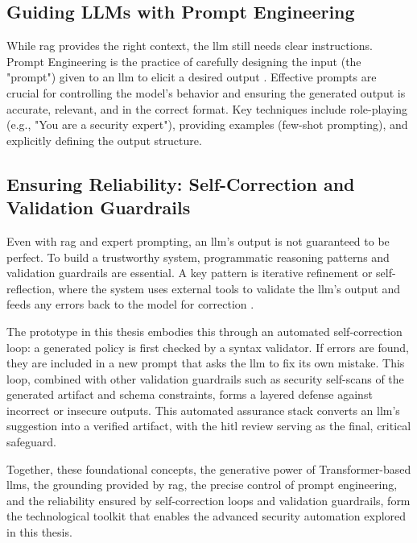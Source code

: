 \subsection{Guiding LLMs with Prompt Engineering}
While \gls{rag} provides the right context, the \gls{llm} still needs clear instructions. Prompt Engineering is the practice of carefully designing the input (the "prompt") given to an \gls{llm} to elicit a desired output \cite{sahoo_systematic_2024}. Effective prompts are crucial for controlling the model's behavior and ensuring the generated output is accurate, relevant, and in the correct format. Key techniques include role-playing (e.g., "You are a security expert"), providing examples (few-shot prompting), and explicitly defining the output structure.

\subsection{Ensuring Reliability: Self-Correction and Validation Guardrails}
Even with \gls{rag} and expert prompting, an \gls{llm}'s output is not guaranteed to be perfect. To build a trustworthy system, programmatic reasoning patterns and validation guardrails are essential. A key pattern is iterative refinement or self-reflection, where the system uses external tools to validate the \gls{llm}'s output and feeds any errors back to the model for correction \cite{vaswani_attention_2023}.

The prototype in this thesis embodies this through an automated self-correction loop: a generated policy is first checked by a syntax validator. If errors are found, they are included in a new prompt that asks the \gls{llm} to fix its own mistake. This loop, combined with other validation guardrails such as security self-scans of the generated artifact and schema constraints, forms a layered defense against incorrect or insecure outputs. This automated assurance stack converts an \gls{llm}'s suggestion into a verified artifact, with the \gls{hitl} review serving as the final, critical safeguard.

Together, these foundational concepts, the generative power of Transformer-based \glspl{llm}, the grounding provided by \gls{rag}, the precise control of prompt engineering, and the reliability ensured by self-correction loops and validation guardrails, form the technological toolkit that enables the advanced security automation explored in this thesis.


